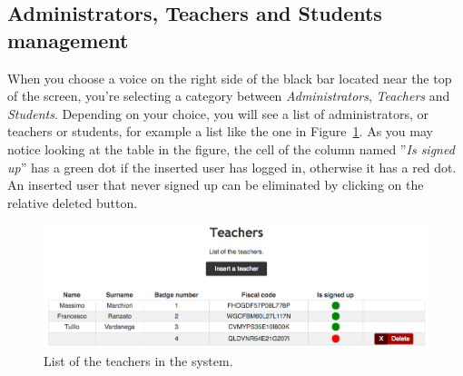 \subsection{Administrators, Teachers and Students management} \label{subsec:ats}
When you choose a voice on the right side of the black bar located near the top of the screen, you're selecting a category between \emph{Administrators}, \emph{Teachers} and \emph{Students}.  Depending on your choice, you will see a list of administrators, or teachers or students, for example a list like the one in Figure~\ref{fig:userList}. As you may notice looking at the table in the figure, the cell of the column named ''\emph{Is signed up}'' has a green dot if the inserted user has logged in, otherwise it has a red dot. An inserted user that never signed up can be eliminated by clicking on the relative deleted button.
\begin{figure}[H]
	\centering
	\includegraphics[width=1.0\textwidth]{img/userList.png}
	\caption{List of the teachers in the system.}
	\label{fig:userList}
\end{figure}

